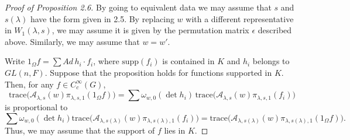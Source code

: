 \documentclass{amsart}
\begin{document}
\begin{proof}[Proof of Proposition 2.6]
By going to equivalent data we may assume that 
  $s$ and 
  $ s(\lambda) $
have the form given in 2.5.
By replacing $w$ with a different representative in
  $ W_1(\lambda,s) $,
we may assume it is given by the permutation matrix $\epsilon$
described above.
Similarly, we may assume that
  $ w = w' $.

Write
  $ 1_{\Omega} f =
   \sum Ad \, h_i \cdot f_i $,
where
  $ \text {supp} (f_i)$ is contained in $K$
and
  $ h_i$ belongs to $GL(n,F)$.
Suppose that the proposition holds for functions supported in $K$.
Then, for any 
  $ f \in C_c^{\infty}(G) $,
%
$$
  \text{trace}
  \bigl(
    {\mathcal A}_{\lambda,s} (w)
    \pi_{\lambda,s,1}
    (1_{\Omega} f)
  \bigr)
=
  \sum
  \omega_{w,0}
  (\det h_i) \,
  \text{trace}
  \bigl(
    {\mathcal A}_{\lambda,s} (w)
    \pi_{\lambda,s,1}
    (f_i)
  \bigr)
$$
%
is proportional to
%
$$
  \sum  \omega_{w,0}
  ( \det h_i)
  \text{trace}
  \bigl(
    {\mathcal A}_{\lambda,s(\lambda)} (w)
    \pi_{\lambda,s(\lambda),1}
    (f_i)
  \bigr)
=  
  \text{trace}
  \bigl(
    {\mathcal A}_{\lambda,s(\lambda)} (w)
    \pi_{\lambda,s(\lambda),1}
    (1_{\Omega}f)
  \bigr).
$$
%
Thus, we may assume that the support of $f$ lies in $K$.


\end{proof}
\end{document}
